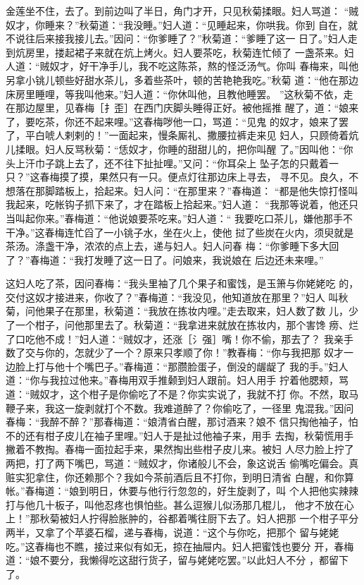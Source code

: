 金莲坐不住，去了。到前边叫了半日，角门才开，只见秋菊揉眼。妇人骂道：
“贼奴才，你睡来？”秋菊道：“我没睡。”妇人道：“见睡起来，你哄我。你到
自在，就不说往后来接我接儿去。”因问：“你爹睡了？”秋菊道：“爹睡了这一
日了。”妇人走到炕房里，搂起裙子来就在炕上烤火。妇人要茶吃，秋菊连忙倾了
一盏茶来。妇人道：“贼奴才，好干净手儿，我不吃这陈茶，熬的怪泛汤气。你叫
春梅来，叫他另拿小铫儿顿些好甜水茶儿，多着些茶叶，顿的苦艳艳我吃。”秋菊
道：“他在那边床房里睡哩，等我叫他来。”妇人道：“你休叫他，且教他睡罢。
”这秋菊不依，走在那边屋里，见春梅［扌歪］在西门庆脚头睡得正好。被他摇推
醒了，道：“娘来了，要吃茶，你还不起来哩。”这春梅哕他一口，骂道：“见鬼
的奴才，娘来了罢了，平白唬人剌剌的！”一面起来，慢条厮礼、撒腰拉裤走来见
妇人，只顾倚着炕儿揉眼。妇人反骂秋菊：“恁奴才，你睡的甜甜儿的，把你叫醒
了。”因叫他：“你头上汗巾子跳上去了，还不往下扯扯哩。”又问：“你耳朵上
坠子怎的只戴着一只？”这春梅摸了摸，果然只有一只。便点灯往那边床上寻去，
寻不见。良久，不想落在那脚踏板上，拾起来。妇人问：“在那里来？”春梅道：
“都是他失惊打怪叫我起来，吃帐钩子抓下来了，才在踏板上拾起来。”妇人道：
“我那等说着，他还只当叫起你来。”春梅道：“他说娘要茶吃来。”妇人道：“
我要吃口茶儿，嫌他那手不干净。”这春梅连忙舀了一小铫子水，坐在火上，使他
挝了些炭在火内，须臾就是茶汤。涤盏干净，浓浓的点上去，递与妇人。妇人问春
梅：“你爹睡下多大回了？”春梅道：“我打发睡了这一日了。问娘来，我说娘在
后边还未来哩。”

这妇人吃了茶，因问春梅：“我头里袖了几个果子和蜜饯，是玉箫与你姥姥吃
的，交付这奴才接进来，你收了？”春梅道：“我没见，他知道放在那里？”妇人
叫秋菊，问他果子在那里，秋菊道：“我放在拣妆内哩。”走去取来，妇人数了数
儿，少了一个柑子，问他那里去了。秋菊道：“我拿进来就放在拣妆内，那个害馋
痨、烂了口吃他不成！”妇人道：“贼奴才，还涨［氵强］嘴！你不偷，那去了？
我亲手数了交与你的，怎就少了一个？原来只孝顺了你！”教春梅：“你与我把那
奴才一边脸上打与他十个嘴巴子。”春梅道：“那臜脸蛋子，倒没的龌龊了
我的手。”妇人道：“你与我拉过他来。”春梅用双手推颡到妇人跟前。妇人用手
拧着他腮颊，骂道：“贼奴才，这个柑子是你偷吃了不是？你实实说了，我就不打
你。不然，取马鞭子来，我这一旋剥就打个不数。我难道醉了？你偷吃了，一径里
鬼混我。”因问春梅：“我醉不醉？”那春梅道：“娘清省白醒，那讨酒来？娘不
信只掏他袖子，怕不的还有柑子皮儿在袖子里哩。”妇人于是扯过他袖子来，用手
去掏，秋菊慌用手撇着不教掏。春梅一面拉起手来，果然掏出些柑子皮儿来。被妇
人尽力脸上拧了两把，打了两下嘴巴，骂道：“贼奴才，你诸般儿不会，象这说舌
偷嘴吃偏会。真赃实犯拿住，你还赖那个？我如今茶前酒后且不打你，到明日清省
白醒，和你算帐。”春梅道：“娘到明日，休要与他行行忽忽的，好生旋剥了，叫
个人把他实辣辣打与他几十板子，叫他忍疼也惧怕些。甚么逗猴儿似汤那几棍儿，
他才不放在心上！”那秋菊被妇人拧得脸胀肿的，谷都着嘴往厨下去了。妇人把那
一个柑子平分两半，又拿了个苹婆石榴，递与春梅，说道：“这个与你吃，把那个
留与姥姥吃。”这春梅也不瞧，接过来似有如无，掠在抽屉内。妇人把蜜饯也要分
开，春梅道：“娘不要分，我懒得吃这甜行货子，留与姥姥吃罢。”以此妇人不分
，都留下了。

